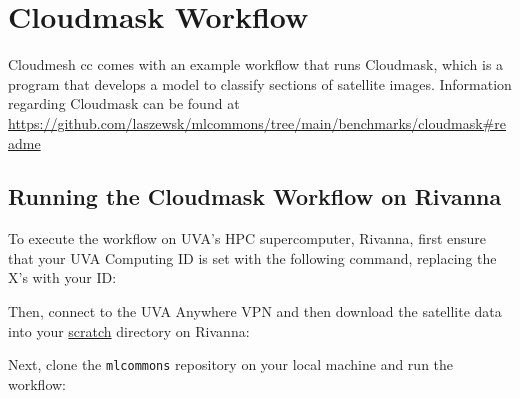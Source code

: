 \section{Cloudmask Workflow}\label{cloudmask-workflow}

Cloudmesh cc comes with an example workflow that runs Cloudmask, which
is a program that develops a model to classify sections of satellite
images. Information regarding Cloudmask can be found at
\url{https://github.com/laszewsk/mlcommons/tree/main/benchmarks/cloudmask\#readme}

\subsection{Running the Cloudmask Workflow on
Rivanna}\label{running-the-cloudmask-workflow-on-rivanna}

To execute the workflow on UVA's HPC supercomputer, Rivanna, first
ensure that your UVA Computing ID is set with the following command,
replacing the X's with your ID:

\begin{Shaded}
\begin{Highlighting}[]
\end{Highlighting}
\end{Shaded}

Then, connect to the UVA Anywhere VPN and then download the satellite
data into your
\href{https://www.rc.virginia.edu/userinfo/storage/non-sensitive-data/\#scratch}{scratch}
directory on Rivanna:

\begin{Shaded}
\begin{Highlighting}[]
\end{Highlighting}
\end{Shaded}

Next, clone the \texttt{mlcommons} repository on your local machine and
run the workflow:

\begin{Shaded}
\begin{Highlighting}[]
  \OperatorTok{=}
\end{Highlighting}
\end{Shaded}

